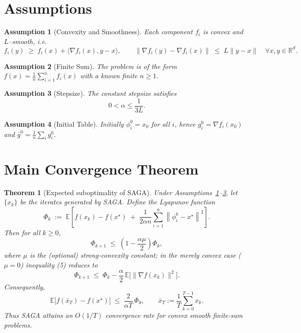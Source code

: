 \documentclass{article}
\newtheorem{theorem}{Theorem}
\newtheorem{assumption}{Assumption}
\newcommand{\E}{\mathbb{E}}
\newcommand{\norm}[1]{\left\lVert#1\right\rVert}
\newcommand{\grad}{\nabla}
\begin{document}
\section*{Assumptions}
\begin{assumption}[Convexity and Smoothness]\label{ass:convex}
Each component $f_i$ is convex and $L$–smooth, i.e.
\[
f_i(y)\;\ge\;f_i(x)+\langle\grad f_i(x),y-x\rangle,
\qquad
\|\grad f_i(y)-\grad f_i(x)\|\;\le\;L\|y-x\|
\quad\forall x,y\in\mathbb{R}^d .
\]
\end{assumption}
\begin{assumption}[Finite Sum]\label{ass:finite}
The problem is of the form $f(x)=\frac1n\sum_{i=1}^n f_i(x)$ with a known finite $n\ge 1$.
\end{assumption}
\begin{assumption}[Stepsize]\label{ass:stepsize}
The constant stepsize satisfies
\[
0<\alpha\le \frac{1}{3L}.
\]
\end{assumption}
\begin{assumption}[Initial Table]\label{ass:table}
Initially $\phi_i^0 = x_0$ for all $i$, hence $g_i^0=\grad f_i(x_0)$ and $\bar g^0=\frac1n\sum_{i}g_i^0$.
\end{assumption}

\section*{Main Convergence Theorem}
\begin{theorem}[Expected suboptimality of SAGA]\label{thm:main}
Under Assumptions~\ref{ass:convex}–\ref{ass:stepsize}, let $\{x_k\}$ be the iterates generated by SAGA.
Define the Lyapunov function
\[
\Phi_k \;:=\; \E\!\left[ f(x_k)-f(x^\star) \;+\;
\frac{1}{2\alpha n}\sum_{i=1}^{n}\norm{\phi_i^k-x^\star}^2 \right].
\]
Then for all $k\ge 0$,
\[
\Phi_{k+1}\;\le\;\left(1-\frac{\alpha\mu}{2}\right)\Phi_k,
\tag{5}
\]
where $\mu$ is the (optional) strong‑convexity constant; in the merely convex case ($\mu=0$) inequality (5) reduces to
\[
\Phi_{k+1}\;\le\;\Phi_k-\frac{\alpha}{2}\,\E\!\bigl[\| \grad f(x_k)\|^2\bigr].
\tag{5$^\prime$}
\]
Consequently,
\[
\E\!\bigl[f(\bar x_T)-f(x^\star)\bigr]\;\le\;\frac{2}{\alpha T}\,\Phi_0,
\qquad 
\bar x_T:=\frac{1}{T}\sum_{k=0}^{T-1}x_k .
\]
Thus SAGA attains an $O(1/T)$ convergence rate for convex smooth finite‑sum problems.
\end{theorem}
\end{document}
